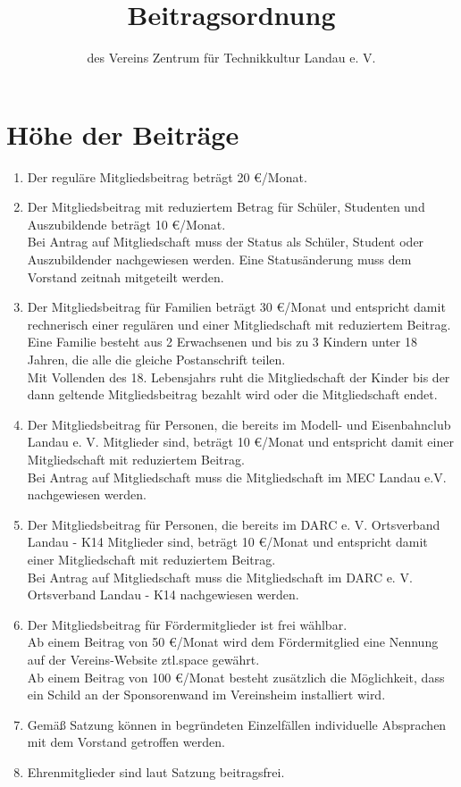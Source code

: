 \documentclass[a4paper, 12pt]{scrartcl}
\begin{document}
\title{Beitragsordnung}
\subtitle{des Vereins Zentrum für Technikkultur Landau e. V.}
\author{}
\date{}

\maketitle

\section{Höhe der Beiträge}
\begin{enumerate}
	\item Der reguläre Mitgliedsbeitrag beträgt 20 \euro/Monat.
	\item Der Mitgliedsbeitrag mit reduziertem Betrag für Schüler, Studenten und Auszubildende beträgt 10 \euro/Monat.\\ 
	Bei Antrag auf Mitgliedschaft muss der Status als Schüler, Student oder Auszubildender nachgewiesen werden.
	Eine Statusänderung muss dem Vorstand zeitnah mitgeteilt werden.
	\item Der Mitgliedsbeitrag für Familien beträgt 30 \euro/Monat und entspricht damit rechnerisch einer regulären und einer Mitgliedschaft mit reduziertem Beitrag. \\ 
Eine Familie besteht aus 2 Erwachsenen und bis zu 3 Kindern unter 18 Jahren, die alle die gleiche Postanschrift teilen.\\
Mit Vollenden des 18. Lebensjahrs ruht die Mitgliedschaft der Kinder bis der dann geltende Mitgliedsbeitrag bezahlt wird oder die Mitgliedschaft endet. 
	\item Der Mitgliedsbeitrag für Personen, die bereits im Modell- und Eisenbahnclub Landau e. V. Mitglieder sind, beträgt 10 \euro/Monat und entspricht damit einer Mitgliedschaft mit reduziertem Beitrag.\\ Bei Antrag auf Mitgliedschaft muss die Mitgliedschaft im MEC Landau e.V. nachgewiesen werden.
	\item Der Mitgliedsbeitrag für Personen, die bereits im DARC e. V. Ortsverband Landau - K14 Mitglieder sind, beträgt 10 \euro/Monat und entspricht damit einer Mitgliedschaft mit reduziertem Beitrag.\\ Bei Antrag auf Mitgliedschaft muss die Mitgliedschaft im DARC e. V. Ortsverband Landau - K14 nachgewiesen werden.
	\item Der Mitgliedsbeitrag für Fördermitglieder ist frei wählbar. \\
	Ab einem Beitrag von 50 \euro/Monat wird dem Fördermitglied eine Nennung auf der Vereins-Website ztl.space gewährt. \\
	Ab einem Beitrag von 100 \euro/Monat besteht zusätzlich die Möglichkeit, dass ein Schild an der Sponsorenwand im Vereinsheim installiert wird.
	\item Gemäß Satzung können in begründeten Einzelfällen individuelle Absprachen mit dem Vorstand getroffen werden. 
	\item Ehrenmitglieder sind laut Satzung beitragsfrei.
\end{enumerate}
\end{document}
